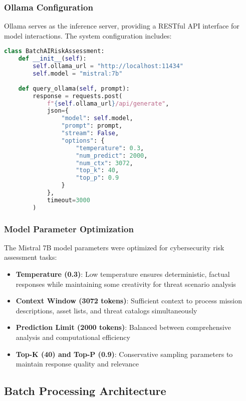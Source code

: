 \documentclass[binding=0.6cm]{sapthesis}
\begin{document}
\subsubsection{Ollama Configuration}

Ollama serves as the inference server, providing a RESTful API interface for model interactions. The system configuration includes:

\begin{lstlisting}[language=Python, caption=Ollama Integration Configuration]
class BatchAIRiskAssessment:
    def __init__(self):
        self.ollama_url = "http://localhost:11434"
        self.model = "mistral:7b"
        
    def query_ollama(self, prompt):
        response = requests.post(
            f"{self.ollama_url}/api/generate",
            json={
                "model": self.model,
                "prompt": prompt,
                "stream": False,
                "options": {
                    "temperature": 0.3,
                    "num_predict": 2000,
                    "num_ctx": 3072,
                    "top_k": 40,
                    "top_p": 0.9
                }
            },
            timeout=3000
        )
\end{lstlisting}

\subsubsection{Model Parameter Optimization}

The Mistral 7B model parameters were optimized for cybersecurity risk assessment tasks:

\begin{itemize}
    \item \textbf{Temperature (0.3)}: Low temperature ensures deterministic, factual responses while maintaining some creativity for threat scenario analysis
    \item \textbf{Context Window (3072 tokens)}: Sufficient context to process mission descriptions, asset lists, and threat catalogs simultaneously
    \item \textbf{Prediction Limit (2000 tokens)}: Balanced between comprehensive analysis and computational efficiency
    \item \textbf{Top-K (40) and Top-P (0.9)}: Conservative sampling parameters to maintain response quality and relevance
\end{itemize}

\subsection{Batch Processing Architecture}
\end{document}
